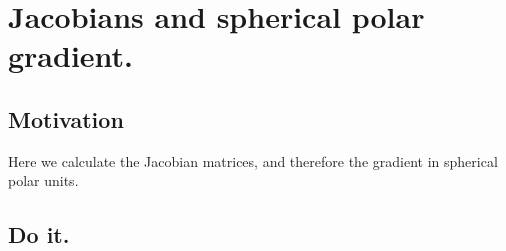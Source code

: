

\chapter{Jacobians and spherical polar gradient.}
\label{chap:jacobianSphericalPolar}
{}
\date{Dec XX, 2009}

\beginArtWithToc

\section{Motivation}

Here we calculate the Jacobian matrices, and therefore the gradient in spherical polar units.

\section{Do it.}

\EndNoBibArticle
